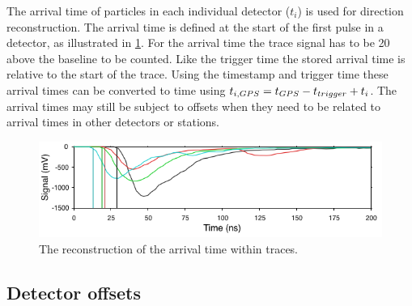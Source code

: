 The arrival time of particles in each individual detector ($t_i$) is used for direction  reconstruction. The arrival time is defined at the start of the first pulse in a detector, as illustrated in \cref{fig:arrival_time}. For the arrival time the trace signal has to be \SI{20}{\adc} above the baseline to be counted. Like the trigger time the stored arrival time is relative to the start of the trace. Using the \gps timestamp and trigger time these arrival times can be converted to \gps time using $t_{i,\gps} = t_{\gps} - t_{trigger} + t_i$. The arrival times may still be subject to offsets when they need to be related to arrival times in other detectors or stations.

\begin{figure}
    \centering
    \includegraphics[width=0.7\linewidth]{plots/processing/arrival_time.png}
    \caption{The reconstruction of the arrival time within traces.}
    \label{fig:arrival_time}
\end{figure}


\subsection{Detector offsets}
\label{sec:process_detector_offsets}

